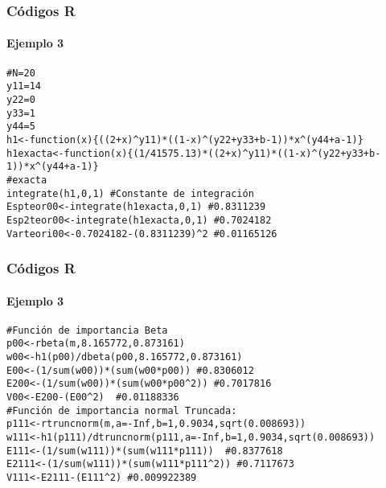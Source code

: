 \documentclass[12pt]{beamer}
\begin{document}
\begin{frame}[fragile]
\frametitle{Códigos R}
\framesubtitle{Ejemplo 3}
\begin{verbatim}
#N=20
y11=14
y22=0
y33=1
y44=5
h1<-function(x){((2+x)^y11)*((1-x)^(y22+y33+b-1))*x^(y44+a-1)}
h1exacta<-function(x){(1/41575.13)*((2+x)^y11)*((1-x)^(y22+y33+b-1))*x^(y44+a-1)}
#exacta
integrate(h1,0,1) #Constante de integración
Espteor00<-integrate(h1exacta,0,1) #0.8311239 
Esp2teor00<-integrate(h1exacta,0,1) #0.7024182
Varteori00<-0.7024182-(0.8311239)^2 #0.01165126
\end{verbatim}
\end{frame}

\begin{frame}[fragile]
\frametitle{Códigos R}
\framesubtitle{Ejemplo 3}
\begin{verbatim}
#Función de importancia Beta
p00<-rbeta(m,8.165772,0.873161)
w00<-h1(p00)/dbeta(p00,8.165772,0.873161)
E00<-(1/sum(w00))*(sum(w00*p00)) #0.8306012
E200<-(1/sum(w00))*(sum(w00*p00^2)) #0.7017816
V00<-E200-(E00^2)  #0.01188336
#Función de importancia normal Truncada:
p111<-rtruncnorm(m,a=-Inf,b=1,0.9034,sqrt(0.008693))
w111<-h1(p111)/dtruncnorm(p111,a=-Inf,b=1,0.9034,sqrt(0.008693))
E111<-(1/sum(w111))*(sum(w111*p111))  #0.8377618
E2111<-(1/sum(w111))*(sum(w111*p111^2)) #0.7117673
V111<-E2111-(E111^2) #0.009922389
\end{verbatim}
\end{frame}
\end{document}
